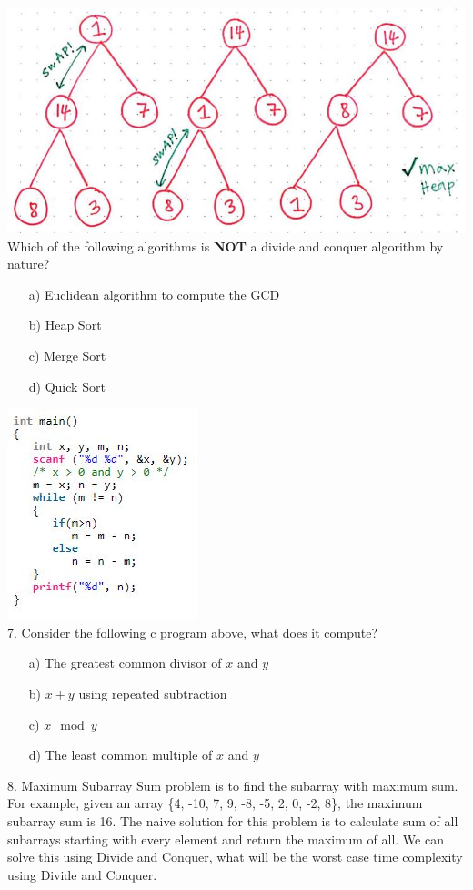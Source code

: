 \documentclass[12pt]{article}
\begin{document}
\noindent \includegraphics[scale = 0.5]{hs.jpg}\\
Which of the following algorithms is \textbf{NOT} a divide and conquer algorithm by nature?\\
\begin{enumerate}
    \item[a)]Euclidean algorithm to compute the GCD
    \item[b)]Heap Sort
    \item[c)]Merge Sort
    \item[d)]Quick Sort
\end{enumerate}
\newpage
\noindent \includegraphics{c.jpg}\\
7. Consider the following c program above, what does it compute?
\begin{enumerate}
    \item[a)]The greatest common divisor of $x$ and $y$
    \item[b)]$x + y$ using repeated subtraction
    \item[c)]$x \mod y$ 
    \item[d)]The least common multiple of $x$ and $y$
\end{enumerate}
8. Maximum Subarray Sum problem is to find the subarray with maximum sum. For example, given an array \{4, -10, 7, 9, -8, -5, 2, 0, -2, 8\}, the maximum subarray sum is 16. The naive solution for this problem is to calculate sum of all subarrays starting with every element and return the maximum of all. We can solve this using Divide and Conquer, what will be the worst case time complexity using Divide and Conquer.\\
\end{document}
